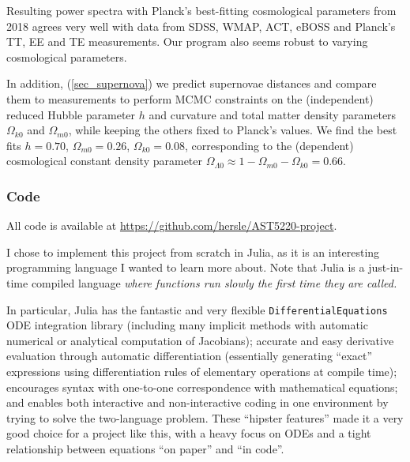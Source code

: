 \documentclass[10pt,a4paper]{article}
\begin{document}
	Resulting power spectra with Planck's best-fitting cosmological parameters from 2018
	agrees very well with data from SDSS, WMAP, ACT, eBOSS and Planck's TT, EE and TE measurements.
	Our program also seems robust to varying cosmological parameters.

	In addition, (\ref{sec_supernova})
	we predict supernovae distances and compare them to measurements
	to perform MCMC constraints on the (independent) reduced Hubble parameter $h$ and curvature and total matter density parameters $\Omega_{k0}$ and $\Omega_{m0}$,
	while keeping the others fixed to Planck's values.
	We find the best fits $h = 0.70$, $\Omega_{m0} = 0.26$, $\Omega_{k0} = 0.08$,
	corresponding to the (dependent) cosmological constant density parameter $\Omega_{\Lambda 0} \approx 1 - \Omega_{m0} - \Omega_{k0} = 0.66$.

%


\bigskip \bigskip \bigskip

\subsubsection*{\centering Code}

All code is available at \href{https://github.com/hersle/AST5220-project}{https://github.com/hersle/AST5220-project}.

I chose to implement this project from scratch in Julia,
as it is an interesting programming language I wanted to learn more about.
Note that Julia is a just-in-time compiled language
\emph{where functions run slowly the first time they are called.}

In particular, Julia has the fantastic and very flexible \texttt{DifferentialEquations} ODE integration library
(including many implicit methods with automatic numerical or analytical computation of Jacobians);
accurate and easy derivative evaluation through automatic differentiation
(essentially generating ``exact'' expressions using differentiation rules of elementary operations at compile time);
encourages syntax with one-to-one correspondence with mathematical equations;
and enables both interactive and non-interactive coding in one environment by trying to solve the two-language problem.
These ``hipster features'' made it a very good choice for a project like this,
with a heavy focus on ODEs and a tight relationship between equations ``on paper'' and ``in code''.
\end{document}
